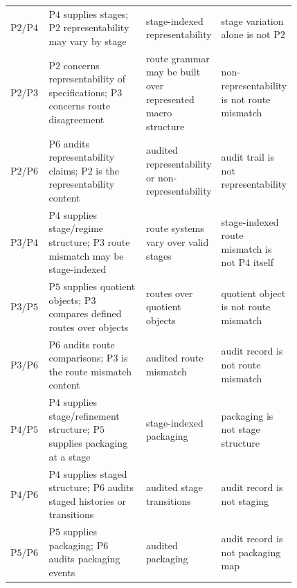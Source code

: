 \documentclass[11pt]{article}
\theoremstyle{definition}
\newcommand{\Ptwo}{\ensuremath{\mathrm{P2}}}
\newcommand{\Pthree}{\ensuremath{\mathrm{P3}}}
\newcommand{\Pfour}{\ensuremath{\mathrm{P4}}}
\newcommand{\Pfive}{\ensuremath{\mathrm{P5}}}
\newcommand{\Psix}{\ensuremath{\mathrm{P6}}}
\begin{document}
\begin{landscape}
\begin{table}
\begin{tabular}{@{}lp{0.34\linewidth}p{0.24\linewidth}p{0.24\linewidth}@{}}
\Ptwo{}/\Pfour{} & \Pfour{} supplies stages; \Ptwo{} representability may vary by stage & stage-indexed representability & stage variation alone is not \Ptwo{} \\
\Ptwo{}/\Pthree{} & \Ptwo{} concerns representability of specifications; \Pthree{} concerns route disagreement & route grammar may be built over represented macro structure & non-representability is not route mismatch \\
\Ptwo{}/\Psix{} & \Psix{} audits representability claims; \Ptwo{} is the representability content & audited representability or non-representability & audit trail is not representability \\
\Pthree{}/\Pfour{} & \Pfour{} supplies stage/regime structure; \Pthree{} route mismatch may be stage-indexed & route systems vary over valid stages & stage-indexed route mismatch is not \Pfour{} itself \\
\Pthree{}/\Pfive{} & \Pfive{} supplies quotient objects; \Pthree{} compares defined routes over objects & routes over quotient objects & quotient object is not route mismatch \\
\Pthree{}/\Psix{} & \Psix{} audits route comparisons; \Pthree{} is the route mismatch content & audited route mismatch & audit record is not route mismatch \\
\Pfour{}/\Pfive{} & \Pfour{} supplies stage/refinement structure; \Pfive{} supplies packaging at a stage & stage-indexed packaging & packaging is not stage structure \\
\Pfour{}/\Psix{} & \Pfour{} supplies staged structure; \Psix{} audits staged histories or transitions & audited stage transitions & audit record is not staging \\
\Pfive{}/\Psix{} & \Pfive{} supplies packaging; \Psix{} audits packaging events & audited packaging & audit record is not packaging map \\
\bottomrule
\end{tabular}
\end{table}
\end{landscape}
 


\end{document}

